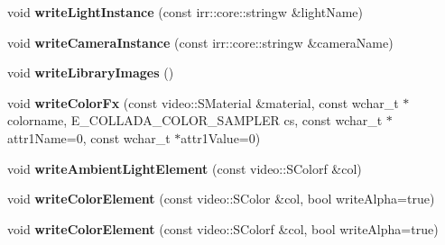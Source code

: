 \begin{DoxyCompactItemize}
\item 
\hypertarget{classirr_1_1scene_1_1_c_collada_mesh_writer_aa62ed8de8c90c44a51b7dcc1fc7467ac}{void {\bfseries write\-Light\-Instance} (const irr\-::core\-::stringw \&light\-Name)}\label{classirr_1_1scene_1_1_c_collada_mesh_writer_aa62ed8de8c90c44a51b7dcc1fc7467ac}

\item 
\hypertarget{classirr_1_1scene_1_1_c_collada_mesh_writer_ac91279874e696355e876a706293f815c}{void {\bfseries write\-Camera\-Instance} (const irr\-::core\-::stringw \&camera\-Name)}\label{classirr_1_1scene_1_1_c_collada_mesh_writer_ac91279874e696355e876a706293f815c}

\item 
\hypertarget{classirr_1_1scene_1_1_c_collada_mesh_writer_a24382cae4533a9f2b5386c655379ca03}{void {\bfseries write\-Library\-Images} ()}\label{classirr_1_1scene_1_1_c_collada_mesh_writer_a24382cae4533a9f2b5386c655379ca03}

\item 
\hypertarget{classirr_1_1scene_1_1_c_collada_mesh_writer_a3c2ecad39590d3628bb45c6852f1189c}{void {\bfseries write\-Color\-Fx} (const video\-::\-S\-Material \&material, const wchar\-\_\-t $\ast$colorname, E\-\_\-\-C\-O\-L\-L\-A\-D\-A\-\_\-\-C\-O\-L\-O\-R\-\_\-\-S\-A\-M\-P\-L\-E\-R cs, const wchar\-\_\-t $\ast$attr1\-Name=0, const wchar\-\_\-t $\ast$attr1\-Value=0)}\label{classirr_1_1scene_1_1_c_collada_mesh_writer_a3c2ecad39590d3628bb45c6852f1189c}

\item 
\hypertarget{classirr_1_1scene_1_1_c_collada_mesh_writer_adde76518490d18e415b16d2fbe54f319}{void {\bfseries write\-Ambient\-Light\-Element} (const video\-::\-S\-Colorf \&col)}\label{classirr_1_1scene_1_1_c_collada_mesh_writer_adde76518490d18e415b16d2fbe54f319}

\item 
\hypertarget{classirr_1_1scene_1_1_c_collada_mesh_writer_ac789ef66ebc0d7c45925585de09de83c}{void {\bfseries write\-Color\-Element} (const video\-::\-S\-Color \&col, bool write\-Alpha=true)}\label{classirr_1_1scene_1_1_c_collada_mesh_writer_ac789ef66ebc0d7c45925585de09de83c}

\item 
\hypertarget{classirr_1_1scene_1_1_c_collada_mesh_writer_a11904ec0e5a3e0724d458b45a2b7f219}{void {\bfseries write\-Color\-Element} (const video\-::\-S\-Colorf \&col, bool write\-Alpha=true)}\label{classirr_1_1scene_1_1_c_collada_mesh_writer_a11904ec0e5a3e0724d458b45a2b7f219}


\end{DoxyCompactItemize}
